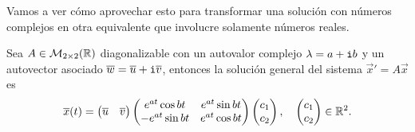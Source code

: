 \documentclass[../ecuaciones_diferenciales.tex]{subfiles}
\begin{document}
Vamos a ver cómo aprovechar esto para transformar una solución con números 
complejos en otra equivalente que involucre solamente números reales. 

\begin{proposition}
	Sea \(A \in \mathcal{M}_{2 \times 2}(\mathbb{R})\) diagonalizable con un autovalor 
	complejo \(\lambda = a + \mathtt{i} b\) y un autovector asociado 
	\(\overline{w} = \overline{u} + \mathtt{i}\overline{v}\), entonces la solución general del sistema
	\(\vec{x}' = A\vec{x}\) es
	\[\overline{x}(t) = \begin{pmatrix}\overline{u} & \overline{v}\end{pmatrix} 
		\begin{pmatrix}e^{at}\cos bt & e^{at}\sin bt \\ -e^{at} \sin bt & e^{at}
		\cos bt\end{pmatrix} \begin{pmatrix}c_1 \\ c_2\end{pmatrix}, \quad \begin{pmatrix}c_1 \\ c_2\end{pmatrix} \in \mathbb{R}^2.\]
\end{proposition}
\end{document}
